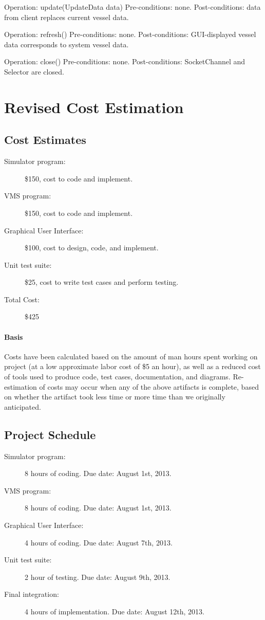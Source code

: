 \documentclass{article}
\begin{document}
Operation: update(UpdateData data)
Pre-conditions: none.
Post-conditions: data from client replaces current vessel data.

Operation: refresh()
Pre-conditions: none.
Post-conditions: GUI-displayed vessel data corresponds to system vessel data.

Operation: close()
Pre-conditions: none.
Post-conditions: SocketChannel and Selector are closed.

\section{Revised Cost Estimation} %

\subsection{Cost Estimates}

\begin{description}
  \item[Simulator program:] \$150, cost to code and implement.
  \item[VMS program:] \$150, cost to code and implement.
  \item[Graphical User Interface:] \$100, cost to design, code, and implement.
  \item[Unit test suite:] \$25, cost to write test cases and perform testing.
  \item[Total Cost:] \$425
\end{description}

\paragraph{Basis} Costs have been calculated based on the amount of man hours spent working on project (at a low approximate labor cost of \$5 an hour), as well as a reduced cost of tools used to produce code, test cases, documentation, and diagrams.
Re-estimation of costs may occur when any of the above artifacts is complete, based on whether the artifact took less time or more time than we originally anticipated.

\subsection{Project Schedule}

\begin{description}
  \item[Simulator program:] 8 hours of coding. Due date: August 1st, 2013.
  \item[VMS program:] 8 hours of coding. Due date: August 1st, 2013.
  \item[Graphical User Interface:] 4 hours of coding. Due date: August 7th, 2013.
  \item[Unit test suite:] 2 hour of testing. Due date: August 9th, 2013.
  \item[Final integration:] 4 hours of implementation. Due date: August 12th, 2013.
\end{description}
\end{document}
